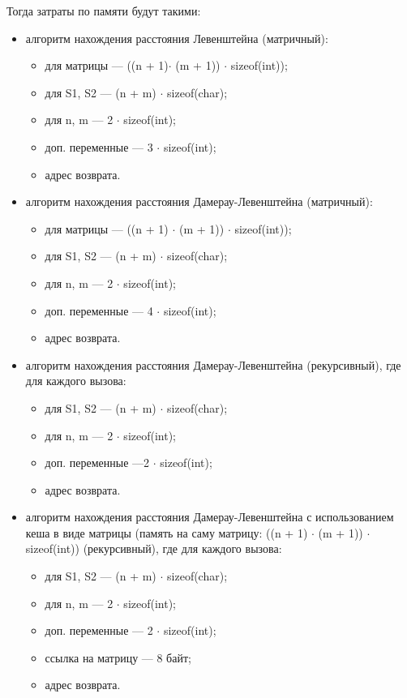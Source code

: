 Тогда затраты по памяти будут такими:
\begin{itemize}[label=---]
    \item алгоритм нахождения расстояния Левенштейна (матричный):

    \begin{itemize}
        \item для матрицы --- ((n + 1)$ \cdot$ (m + 1)) $ \cdot$ sizeof(int));
        \item для S1, S2 --- (n + m) $ \cdot$ sizeof(char);
        \item для n, m --- 2 $ \cdot$ sizeof(int);
        \item доп. переменные --- 3 $ \cdot$ sizeof(int);
        \item адрес возврата.
    \end{itemize}

    \item алгоритм нахождения расстояния Дамерау-Левенштейна (матричный):

    \begin{itemize}
        \item для матрицы --- ((n + 1) $ \cdot$ (m + 1)) $ \cdot$ sizeof(int));
        \item для S1, S2 --- (n + m) $ \cdot$ sizeof(char);
        \item для n, m --- 2 $ \cdot$ sizeof(int);
        \item доп. переменные --- 4 $ \cdot$ sizeof(int);
        \item адрес возврата.
    \end{itemize}

    \item алгоритм нахождения расстояния Дамерау-Левенштейна (рекурсивный), где для каждого вызова:

    \begin{itemize}
        \item для S1, S2 --- (n + m) $ \cdot$ sizeof(char);
        \item для n, m --- 2 $ \cdot$ sizeof(int);
        \item доп. переменные ---2 $ \cdot$ sizeof(int);
        \item адрес возврата.
    \end{itemize}

    \item алгоритм нахождения расстояния Дамерау-Левенштейна с использованием кеша в виде матрицы (память на саму матрицу: ((n + 1) $ \cdot$ (m + 1)) $ \cdot$ sizeof(int)) (рекурсивный), где для каждого вызова:

    \begin{itemize}
        \item для S1, S2 --- (n + m) $ \cdot$ sizeof(char);
        \item для n, m --- 2 $ \cdot$ sizeof(int);
        \item доп. переменные --- 2 $ \cdot$ sizeof(int);
        \item ссылка на матрицу --- 8 байт;
        \item адрес возврата.
    \end{itemize}

\end{itemize}

